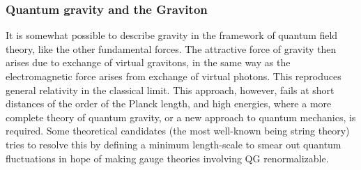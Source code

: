 \subsubsection{Quantum gravity and the Graviton}
It is somewhat possible to describe gravity in the framework of quantum field theory, like the other fundamental forces. The attractive force of gravity then arises due to exchange of virtual gravitons, in the same way as the electromagnetic force arises from exchange of virtual photons. This reproduces general relativity in the classical limit. This approach, however, fails at short distances of the order of the Planck length, and high energies, where a more complete theory of quantum gravity, or a new approach to quantum mechanics, is required. Some theoretical candidates (the most well-known being string theory) tries to resolve this by defining a minimum length-scale to smear out quantum fluctuations in hope of making gauge theories involving QG renormalizable.
